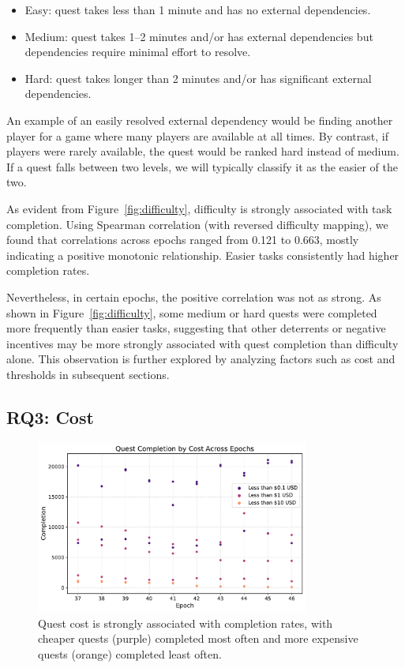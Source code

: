 \begin{itemize}
\item Easy: quest takes less than 1 minute and has no external dependencies.
\item Medium: quest takes 1--2 minutes and/or has external dependencies but dependencies require minimal effort to resolve.
\item Hard: quest takes longer than 2 minutes and/or has significant external dependencies.
\end{itemize}

An example of an easily resolved external dependency would be finding another player for a game where many players are available at all times. By contrast, if players were rarely available, the quest would be ranked hard instead of medium. If a quest falls between two levels, we will typically classify it as the easier of the two. 

As evident from Figure~\ref{fig:difficulty}, difficulty is strongly associated with task completion. Using Spearman correlation (with reversed difficulty mapping), we found that correlations across epochs ranged from 0.121 to 0.663, mostly indicating a positive monotonic relationship. Easier tasks consistently had higher completion rates. 

Nevertheless, in certain epochs, the positive correlation was not as strong. As shown in Figure~\ref{fig:difficulty}, some medium or hard quests were completed more frequently than easier tasks, suggesting that other deterrents or negative incentives may be more strongly associated with quest completion than difficulty alone. This observation is further explored by analyzing factors such as cost and thresholds in subsequent sections.


\subsection{RQ3: Cost}

\begin{figure}[t]
    \centering
    \includegraphics[width=0.8\textwidth]{figures/cost.pdf}
    \caption{Quest cost is strongly associated with completion rates, with cheaper quests (purple) completed most often and more expensive quests (orange) completed least often.\label{fig:cost}}
\end{figure}


